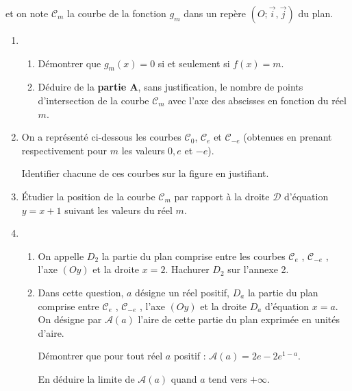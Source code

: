 et on note $\mathscr C_{m}$ la courbe de la fonction $g_{m}$ dans un repère $\left(O; \vec{i}, \vec{j}\right)$ du plan.
\begin{enumerate}
     \item
     \begin{enumerate}[label=\alph*.]
          \item
          Démontrer que $g_{m}\left(x\right)=0$ si et seulement si $f\left(x\right)=m$.
          \item
     Déduire de la \textbf{partie A}, sans justification, le nombre de points d'intersection de la courbe $\mathscr C_{m}$ avec l'axe des abscisses en fonction du réel $m$.\end{enumerate}
     \item
     On a représenté ci-dessous les courbes $\mathscr C_{0}$, $\mathscr C_{e}$ et $\mathscr C_{-e}$ (obtenues en prenant respectivement pour $m$ les valeurs $0, e$ et $-e$).

\begin{center}
\end{center}
  
     Identifier chacune de ces courbes sur la figure en justifiant.
     \item
     Étudier la position de la courbe $\mathscr C_{m}$ par rapport à la droite $\mathscr D$ d'équation $y=x+1$ suivant les valeurs du réel $m$.
     \item
     \begin{enumerate}[label=\alph*.]
          \item
          On appelle $D_{2}$ la partie du plan comprise entre les courbes $\mathscr C_{e}$ , $\mathscr C_{-e}$ , l'axe $\left(Oy\right)$ et la droite $x=2$. Hachurer $D_{2}$ sur l'annexe 2.
          \item
          Dans cette question, $a$ désigne un réel positif, $D_{a}$ la partie du plan comprise entre $\mathscr C_{e}$ , $\mathscr C_{-e}$ , l'axe $\left(Oy\right)$ et la droite $D_{a}$ d'équation $x=a$. On désigne par $\mathscr A\left(a\right)$ l'aire de cette partie du plan exprimée en unités d'aire.
          \par
          Démontrer que pour tout réel $a$ positif : $\mathscr A\left(a\right)=2e-2e^{1-a}$.
          \par
     En déduire la limite de $\mathscr A\left(a\right)$ quand $a$ tend vers $+ \infty $.\end{enumerate}
\end{enumerate}
